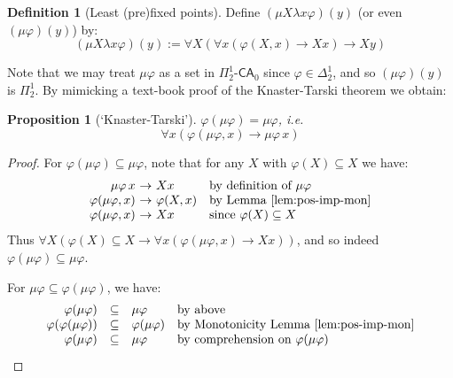 \documentclass[10pt,a4paper]{amsart}
\theoremstyle{plain}
\newtheorem{proposition}[proposition]{Proposition}
\theoremstyle{definition}
\newtheorem{definition}[definition]{Definition}
\renewcommand{\phi}{\varphi}
\theoremstyle{plain}
\theoremstyle{definition} %
\newcommand{\limp}{\to}
\newcommand{\mufo}[3]{\mu #1 \lambda #2 #3}
\newcommand{\Pin}[2]{\Pi^{#1}_{#2}}
\newcommand{\Din}[2]{\Delta^{#1}_{#2}}
\newcommand{\CA}{\mathsf{CA}}
\newcommand{\ca}[1]{#1\text{-}\CA}
\newcommand{\PSCA}{\ca{\Pin 1 2 }_0}
\begin{document}
\begin{definition}
[Least (pre)fixed points]
Define $(\mufo X x \phi)(y)$ (or even $(\mu\phi)(y)$) by:
\[
(\mufo X x \phi) (y) := \forall X (\forall x ( \phi(X,x) \limp Xx ) \limp Xy)
\]
\end{definition}
Note that we may treat $\mu\phi$ as a set in $\PSCA$ since $\phi\in \Din 1 2$, and so $(\mu\phi)(y) $ is $ \Pin 1 2$.
By mimicking a text-book proof of the Knaster-Tarski theorem we obtain:
\begin{proposition}
[`Knaster-Tarski']
    \label{prop:kt-for-least-pre-fixed-point}
    $\phi(\mu\phi)= \mu \phi$, i.e.\ 
    \[
    \forall x (\phi(\mu\phi,x) \limp \mu\phi\, x)
    \]
\end{proposition}
\begin{proof}
    For $\phi(\mu\phi)\subseteq \mu\phi$, note that for any $X$ with $\phi(X)\subseteq X$ we have:
    \[
    \begin{array}{r@{\ \limp \ }ll}
         \mu\phi\, x & Xx & \text{by definition of $\mu\phi$} \\
         \phi(\mu\phi,x) & \phi(X,x) & \text{by Lemma~\ref{lem:pos-imp-mon}}\\ 
         \phi(\mu\phi,x) & Xx & \text{since $\phi(X)\subseteq X$}
    \end{array}
    \]
    Thus $\forall X(\phi(X)\subseteq X \limp \forall x ( \phi(\mu\phi,x) \limp Xx)) $, and so indeed $\phi(\mu\phi)\subseteq \mu\phi$.

    For $\mu\phi \subseteq \phi(\mu\phi)$, we have:
    \[
    \begin{array}[b]{rcll}
         \phi(\mu\phi) &\subseteq & \mu\phi &\text{by above}\\
         \phi(\phi(\mu\phi)) & \subseteq &\phi(\mu\phi) & \text{by Monotonicity Lemma~\ref{lem:pos-imp-mon}}\\
         \phi(\mu\phi) & \subseteq & \mu\phi & \text{by comprehension on $\phi(\mu\phi)$} \tag*{\qed}
    \end{array}
    \]
    \renewcommand{\qed}{}
\end{proof}
\end{document}
